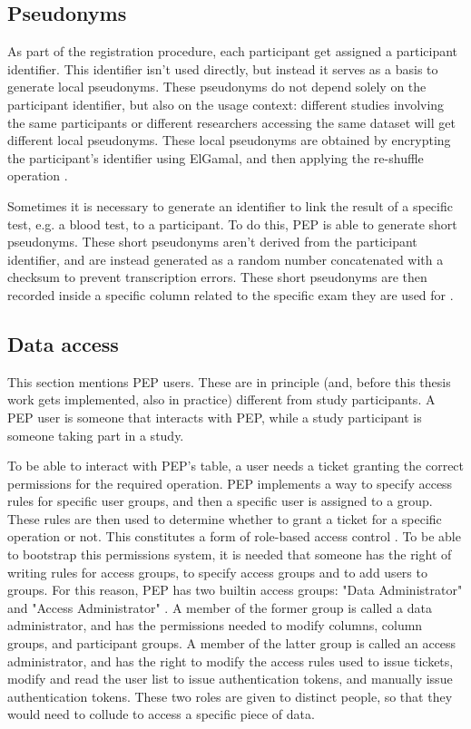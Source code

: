 \documentclass{report}
\begin{document}
\subsection{Pseudonyms}
As part of the registration procedure, each participant get assigned a participant identifier. This identifier isn't used directly, but instead it serves as a basis to generate
local pseudonyms. These pseudonyms do not depend solely on the participant identifier, but also on the usage context: different studies involving the same participants or different
researchers accessing the same dataset will get different local pseudonyms. These local pseudonyms are obtained by encrypting the participant's identifier using ElGamal, and then
applying the re-shuffle operation \cite{pep-blueprint}. \par
Sometimes it is necessary to generate an identifier to link the result of a specific test, e.g. a blood test, to a participant. To do this, PEP is able to generate short
pseudonyms. These short pseudonyms aren't derived from the participant identifier, and are instead generated as a random number concatenated with a checksum to prevent
transcription errors. These short pseudonyms are then recorded inside a specific column related to the specific exam they are used for \cite{pep-blueprint}.

\subsection{Data access}
This section mentions PEP users. These are in principle (and, before this thesis work gets implemented, also in  practice) different from study participants. A PEP user is someone
that interacts with PEP, while a study participant is someone taking part in a study. \par
To be able to interact with PEP's table, a user needs a ticket granting the correct permissions for the required operation. PEP implements a way to specify access rules for
specific user groups, and then a specific user is assigned to a group. These rules are then used to determine whether to grant a ticket for a specific operation or not. This
constitutes a form of role-based access control \cite{rbac}. To be able to bootstrap this permissions system, it is needed that someone has the right of writing rules for access
groups, to specify access groups and to add users to groups. For this reason, PEP has two builtin access groups: "Data Administrator" and "Access Administrator" \cite{pep-blueprint}. A
member of the former group is called a data administrator, and has the permissions needed to modify columns, column groups, and participant groups. A member of the latter group is
called an access administrator, and has the right to modify the access rules used to issue tickets, modify and read the user list to issue authentication tokens, and manually issue
authentication tokens. These two roles are given to distinct people, so that they would need to collude to access a specific piece of data.
\end{document}
